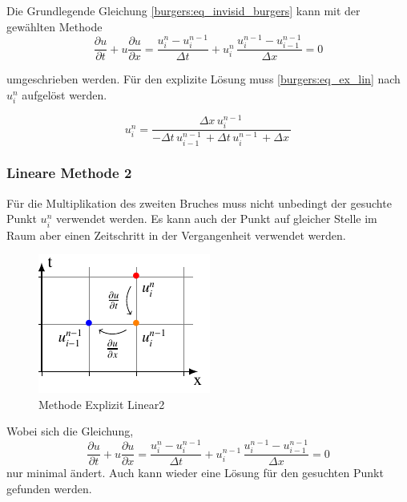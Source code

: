 	Die Grundlegende Gleichung \ref{burgers:eq_invisid_burgers} kann mit der gewählten Methode
	\begin{equation}
	  	\frac {\partial u}{\partial t}+u{\frac {\partial u}{\partial x}} = \frac{u_{i}^{n}-u_{i}^{n-1}}{\Delta t}+ u_{i}^{n}\, \frac{u_{i}^{n-1}-u_{i-1}^{n-1}}{\Delta x}=0
	  	  \label{burgers:eq_ex_lin1}
	  	\end{equation}
	  	
	  	umgeschrieben werden.
	  	Für den explizite Lösung muss \ref{burgers:eq_ex_lin} nach $ u_{i}^{n}$ aufgelöst werden.
	  	
	  	\begin{equation}
	  u_{i}^{n} = \frac{\Delta{x}\, u^{n-1}_{i}\,}{- \Delta{t}\, u^{n-1}_{i-1}\, + \Delta{t}\, u^{n-1}_{i}\, + \Delta{x}\,}
		  \label{burgers:eq_ex_sol_lin1}
	\end{equation}

	
	
\subsubsection{Lineare Methode 2}
	
	
	
	Für die Multiplikation des zweiten Bruches muss nicht unbedingt der gesuchte Punkt $u_{i}^{n}$ verwendet werden.
	Es kann auch der Punkt auf gleicher Stelle im Raum aber einen Zeitschritt in der Vergangenheit verwendet werden.
	
	

     \begin{figure}[!ht]
	\centering
	\includegraphics[height=.4\textwidth]{papers/burgers/BurgersEquation/tikz/Linear2/Linear2.pdf}
	\caption{Methode Explizit Linear2}
	\label{burgers:fig:Linear2}
	\end{figure}

	Wobei sich die Gleichung,
	\begin{equation}
			\frac {\partial u}{\partial t}+u{\frac {\partial u}{\partial x}} = \frac{u_{i}^{n}-u_{i}^{n-1}}{\Delta t}+ u_{i}^{n-1}\, \frac{u_{i}^{n-1}-u_{i-1}^{n-1}}{\Delta x}=0
		\label{burgers:eq_ex_lin2}
	\end{equation}
	 nur minimal ändert.
	 Auch kann wieder eine Lösung für den gesuchten Punkt gefunden werden.
	
